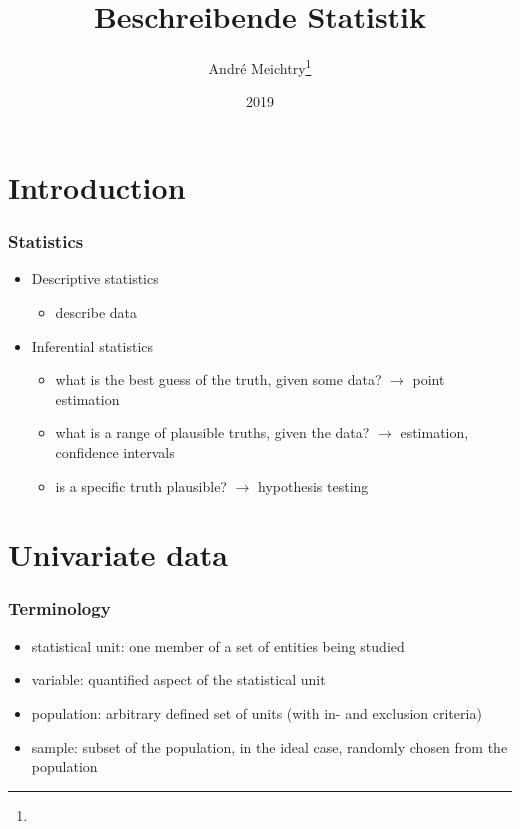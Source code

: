 \documentclass[extsize,handout,10pt]{beamer}\usepackage[]{graphicx}\usepackage[]{color}
\title{Beschreibende Statistik}
\author{André Meichtry\thanks{\WebConsult}}
\date{2019}
\begin{document}



\maketitle
\frame{\tableofcontents}





\section{Introduction}



\begin{frame}
  \frametitle{Statistics}
  \begin{itemize}
  \item \alert{Descriptive} statistics
    \begin{itemize}
    \item describe data
    \end{itemize}
  \item \alert{Inferential} statistics
    \begin{itemize}
    \item what is the best guess of the truth, given some data? $\rightarrow${
        point estimation}
    \item what is a range of plausible truths, given the data?
      $\rightarrow${  estimation, confidence intervals}
    \item is a specific truth plausible? $\rightarrow${ hypothesis testing}
    \end{itemize}
  \end{itemize}
\end{frame}


\section{Univariate data}

\begin{frame}
  \frametitle{Terminology}
  \begin{itemize}
  \item \alert{statistical unit}: one member of a set of entities
    being studied
  \item \alert{variable}: quantified aspect of the statistical unit
  \item \alert{population}: arbitrary defined set of units (with in-
    and exclusion criteria)
  \item \alert{sample}: subset of the population, in the ideal case,
    randomly chosen from the population
  \end{itemize}
\end{frame}
\end{document}
